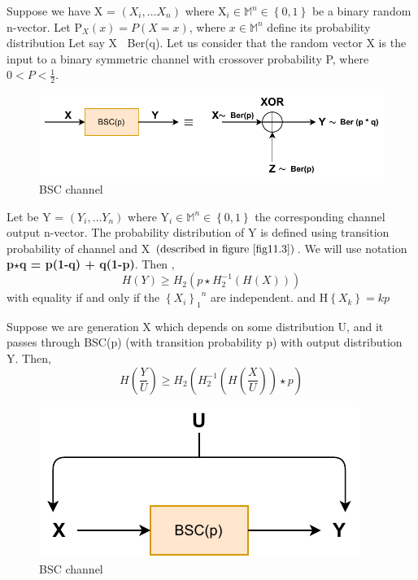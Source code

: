 \documentclass{article}
\begin{document}
Suppose we have X = $\left( X_i, \dots X_n\right)$ where X$_{i} \in \mathbb{M}^{{n}} \in \left \{ 0,1\right \}$
 be a binary random n-vector.
Let P$_{X}(x)= P\left( X = x \right)$, where $x \in \mathbb{M}^{n}$  define its probability distribution Let say X $~$ Ber(q). Let us consider that the random vector X is the input to a binary symmetric channel with crossover probability  P, where $0 < P < \frac{1}{2}$.
\begin{figure}[h!]
	\centering
	\includegraphics[height=.12\textheight]{pic8.pdf}
	\caption{BSC channel }
	\label{fig11.3}
\end{figure}
 Let  be  Y = $\left( Y_i, \dots Y_n\right)$ where Y$_{i} \in \mathbb{M}^{{n}} \in \left \{ 0,1\right \}$
the corresponding channel output n-vector. The probability
distribution of Y is defined using transition probability of channel and X $\left( \text{described in figure \ref{fig11.3}} \right)$.
We will use notation \textbf{p$\star$q = p(1-q) + q(1-p)}. Then ,
\begin{equation}
	H(Y) \geq H_{2}\left( p \star H_{2}^{-1} \left( H(X)\right)\right) \label{11.31}	
\end{equation}		
with equality if and only if the ${\left\{X_{i}\right \}_{1}}^{n}$ are independent. and H$\left\{ X_k
\right\} = kp$ 

Suppose we are generation X which depends on some distribution U, and it passes through BSC(p) (with transition probability p) with output distribution Y. Then,
\begin{equation}
	H\left(\frac{Y}{U}\right) \geq H_2\left( H_{2}^{-1}\left( H\left( \frac{X}{U}\right)\right) \star p\right)
\end{equation}
\begin{figure}[h!]
	\centering
	\includegraphics[height=.12\textheight]{pic9.pdf}
	\caption{BSC channel }
	\label{fig11.4}
\end{figure}
\end{document}
